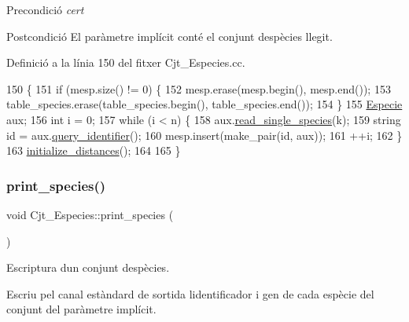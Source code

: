 \begin{DoxyPrecond}{Precondició}
{\itshape cert} 
\end{DoxyPrecond}
\begin{DoxyPostcond}{Postcondició}
El paràmetre implícit conté el conjunt d\textquotesingle{}espècies llegit. 
\end{DoxyPostcond}


Definició a la línia 150 del fitxer Cjt\+\_\+\+Especies.\+cc.


\begin{DoxyCode}
150                                             \{
151     \textcolor{keywordflow}{if} (mesp.size() != 0) \{
152         mesp.erase(mesp.begin(), mesp.end());
153         table\_species.erase(table\_species.begin(), table\_species.end());
154     \}
155     \hyperlink{class_especie}{Especie} aux;
156     \textcolor{keywordtype}{int} i = 0; 
157     \textcolor{keywordflow}{while} (i < n) \{
158         aux.\hyperlink{class_especie_a1a60c5306ae621527bb9183a5c64583f}{read\_single\_species}(k);
159         \textcolor{keywordtype}{string} \textcolor{keywordtype}{id} = aux.\hyperlink{class_especie_acfce0335ac5432dc681c2931b7986ace}{query\_identifier}();
160         mesp.insert(make\_pair(\textcolor{keywordtype}{id}, aux));
161         ++i;
162     \}
163     \hyperlink{class_cjt___especies_ab041e83795b06d02ba7bad8422189361}{initialize\_distances}();
164   
165 \}
\end{DoxyCode}
\mbox{\label{class_cjt___especies_a362d2295d52e2a4cb3618bda7ad3f65b}} 
\subsubsection{\texorpdfstring{print\+\_\+species()}{print\_species()}}
{\footnotesize\ttfamily void Cjt\+\_\+\+Especies\+::print\+\_\+species (\begin{DoxyParamCaption}{ }\end{DoxyParamCaption})}



Escriptura d\textquotesingle{}un conjunt d\textquotesingle{}espècies. 

Escriu pel canal estàndard de sortida l\textquotesingle{}identificador i gen de cada espècie del conjunt del paràmetre implícit.

